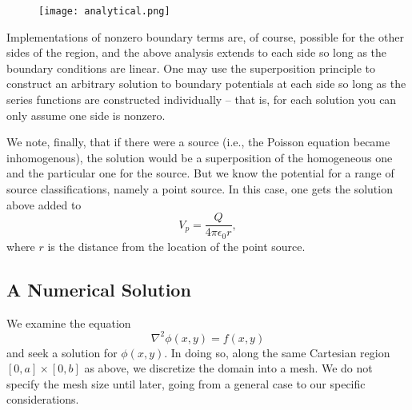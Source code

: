 \documentclass[reprint, amsmath, amssymb, aps, floatfix]{revtex4-1}
\begin{document}
\begin{figure}
	\hspace{-1cm}
	\texttt{[image: analytical.png]}
	\label{analytical}
\end{figure}

Implementations of nonzero boundary terms are, of course, possible for the other sides of the region, and the above analysis extends to each side so long as the boundary conditions are linear. One may use the superposition principle to construct an arbitrary solution to boundary potentials at each side so long as the series functions are constructed individually -- that is, for each solution you can only assume one side is nonzero.

We note, finally, that if there were a source (i.e., the Poisson equation became inhomogenous), the solution would be a superposition of the homogeneous one and the particular one for the source. But we know the potential for a range of source classifications, namely a point source. In this case, one gets the solution above added to \begin{equation} V_p = \frac{Q}{4\pi\epsilon_0 r}, \label{pointv} \end{equation} where $r$ is the distance from the location of the point source.

\subsection{A Numerical Solution}

We examine the equation \begin{equation}
\nabla^2\phi(x,y)=f(x,y) \label{sourceeq}
\end{equation} and seek a solution for $\phi(x,y)$.
In doing so, along the same Cartesian region $[0,a]\times [0,b]$ as above, we discretize the domain into a mesh. We do not specify the mesh size until later, going from a general case to our specific considerations.
\end{document}
